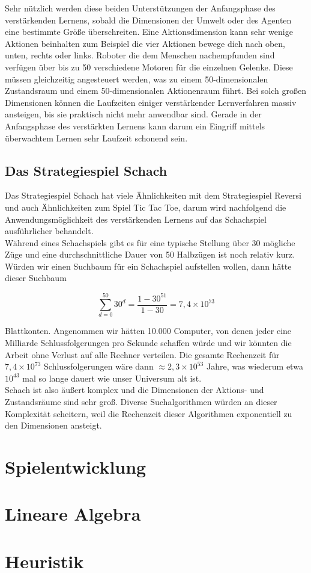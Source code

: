Sehr nützlich werden diese beiden Unterstützungen der Anfangsphase des verstärkenden Lernens, sobald die Dimensionen der Umwelt oder des Agenten eine bestimmte Größe überschreiten. Eine Aktionsdimension kann sehr wenige Aktionen beinhalten zum Beispiel die vier Aktionen bewege dich nach oben, unten, rechts oder links. Roboter die dem Menschen nachempfunden sind verfügen über bis zu 50 verschiedene Motoren für die einzelnen Gelenke. Diese müssen gleichzeitig angesteuert werden, was zu einem 50-dimensionalen Zustandsraum und einem 50-dimensionalen Aktionenraum führt\cite[\acs{vgl.} 305\psq]{Ertel}. Bei solch großen Dimensionen können die Laufzeiten einiger verstärkender Lernverfahren massiv ansteigen, bis sie praktisch nicht mehr anwendbar sind. Gerade in der Anfangsphase des verstärkten Lernens kann darum ein Eingriff mittels überwachtem Lernen sehr Laufzeit schonend sein.

\subsection{Das Strategiespiel Schach}
Das Strategiespiel Schach hat viele Ähnlichkeiten mit dem Strategiespiel Reversi und auch Ähnlichkeiten zum Spiel Tic Tac Toe, darum wird nachfolgend die  Anwendungsmöglichkeit des verstärkenden Lernens auf das Schachspiel ausführlicher behandelt. \\

Während eines Schachspiels gibt es für eine typische Stellung über 30 mögliche Züge und eine durchschnittliche Dauer von 50 Halbzügen ist noch relativ kurz. Würden wir einen Suchbaum  für ein Schachspiel aufstellen wollen, dann hätte dieser Suchbaum

\begin{equation}
\sum_{d=0}^{50} 30^{d} = \frac{1 - 30^{51}}{1 - 30} = 7,4 \times 10^{73}
\end{equation}

Blattkonten. Angenommen wir hätten 10.000 Computer, von denen jeder eine Milliarde Schlussfolgerungen pro Sekunde schaffen würde und wir könnten die Arbeit ohne Verlust auf alle Rechner verteilen. Die gesamte Rechenzeit für $7,4 \times 10^{73}$ Schlussfolgerungen wäre dann $\approx 2,3 \times 10^{53}$ Jahre, was wiederum etwa $10^{43}$ mal so lange dauert wie unser Universum alt ist\cite[93 \psq]{Ertel}. \\

Schach ist also äußert komplex und die Dimensionen der Aktions- und Zustandsräume sind sehr groß. Diverse Suchalgorithmen würden an dieser Komplexität scheitern, weil die Rechenzeit dieser Algorithmen exponentiell zu den Dimensionen ansteigt. 

\section{Spielentwicklung}

\section{Lineare Algebra}

\section{Heuristik}